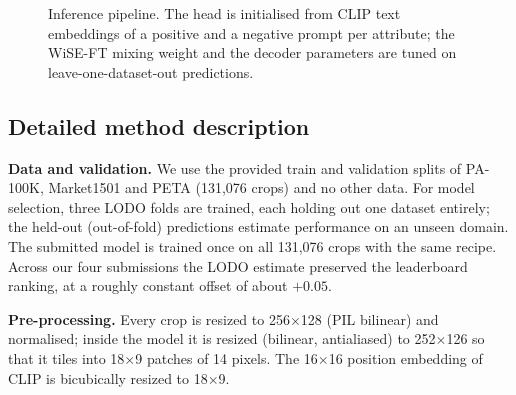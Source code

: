 \documentclass[a4paper, 10pt, conference]{ieeeconf}
\begin{document}
\begin{figure}[h]
\centering
{}
\caption{Inference pipeline. The head is initialised from CLIP text embeddings of a positive and a negative prompt per attribute; the WiSE-FT mixing weight and the decoder parameters are tuned on leave-one-dataset-out predictions.}
\label{fig:pipeline}
\end{figure}

\subsection{Detailed method description}
\textbf{Data and validation.} We use the provided train and validation splits of PA-100K, Market1501 and PETA (131{,}076 crops) and no other data. For model selection, three LODO folds are trained, each holding out one dataset entirely; the held-out (out-of-fold) predictions estimate performance on an unseen domain. The submitted model is trained once on all 131{,}076 crops with the same recipe. Across our four submissions the LODO estimate preserved the leaderboard ranking, at a roughly constant offset of about $+0.05$.

\textbf{Pre-processing.} Every crop is resized to 256$\times$128 (PIL bilinear) and normalised; inside the model it is resized (bilinear, antialiased) to 252$\times$126 so that it tiles into 18$\times$9 patches of 14 pixels. The 16$\times$16 position embedding of CLIP is bicubically resized to 18$\times$9.
\end{document}
